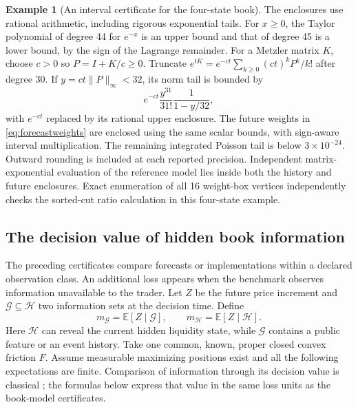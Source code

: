 \documentclass[11pt]{article}
\theoremstyle{plain}
\theoremstyle{definition}
\newtheorem{example}[theorem]{Example}
\theoremstyle{remark}
\newcommand{\E}{\mathbb E}
\begin{document}
\begin{example}[An interval certificate for the four-state book]
The enclosures use rational arithmetic, including rigorous
exponential tails. For \(x\ge0\), the Taylor polynomial of
degree 44 for \(e^{-x}\) is an upper bound and that of degree
45 is a lower bound, by the sign of the Lagrange remainder.
For a Metzler matrix \(K\), choose \(c>0\) so
\(P=I+K/c\ge0\). Truncate
\(e^{tK}=e^{-ct}\sum_{k\ge0}(ct)^kP^k/k!\) after degree 30.
If \(y=ct\|P\|_\infty<32\), its norm tail is bounded by
\[
 e^{-ct}\frac{y^{31}}{31!}\frac1{1-y/32},
\]
with \(e^{-ct}\) replaced by its rational upper enclosure.
The future weights in \eqref{eq:forecastweights} are enclosed
using the same scalar bounds, with sign-aware interval
multiplication. The remaining integrated Poisson tail is below
\(3\times10^{-24}\). Outward rounding is included at each
reported precision.
Independent matrix-exponential evaluation of the reference model
lies inside both the history and future enclosures. Exact
enumeration of all 16 weight-box vertices independently checks
the sorted-cut ratio calculation in this four-state example.
\end{example}


\subsection{The decision value of hidden book information}
\label{sec:bookinformation}

The preceding certificates compare forecasts or implementations
within a declared observation class. An additional loss appears
when the benchmark observes information unavailable to the trader.
Let \(Z\) be the future price increment and
\(\mathcal G\subseteq\mathcal H\) two information sets at the
decision time. Define
\[
 m_{\mathcal G}=\E[Z\mid\mathcal G],\qquad
 m_{\mathcal H}=\E[Z\mid\mathcal H].
\]
Here \(\mathcal H\) can reveal the current hidden liquidity state,
while \(\mathcal G\) contains a public feature or an event history.
Take one common, known, proper closed convex friction \(F\).
Assume measurable maximizing positions exist and all the following
expectations are finite. Comparison of information through its
decision value is classical \citep{Blackwell1953}; the formulas
below express that value in the same loss units as the book-model
certificates.
\end{document}

